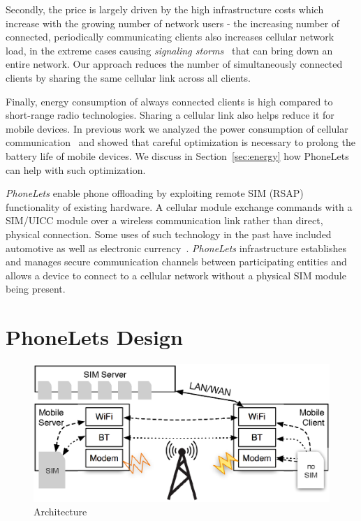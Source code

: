\documentclass{sig-alternate-10pt}
\begin{document}
Secondly, the price is largely driven by the high infrastructure costs which increase with the growing number of network users - the increasing number of connected, periodically communicating clients also increases cellular network load, in the extreme cases causing \emph{signaling storms}~\cite{Yang:wh} that can bring down an entire network. Our approach reduces the number of simultaneously connected clients by sharing the same cellular link across all clients.

Finally, energy consumption of always connected clients is high compared to short-range radio technologies. Sharing a cellular link also helps reduce it for mobile devices. In previous work we analyzed the power consumption of cellular communication~\cite{Aucinas:2013uk} and showed that careful optimization is necessary to prolong the battery life of mobile devices. We discuss in Section~\ref{sec:energy} how PhoneLets can help with such optimization.

\emph{PhoneLets} enable phone offloading by exploiting remote SIM (RSAP) functionality of existing hardware. A cellular module exchange commands with a SIM/UICC module over a wireless communication link rather than direct, physical connection. Some uses of such technology in the past have included automotive as well as electronic currency~\cite{subramanian2003sim}. \emph{PhoneLets} infrastructure establishes and manages secure communication channels between participating entities and allows a device to connect to a cellular network without a physical SIM module being present.


\section{PhoneLets Design}

\begin{figure}
\centering
\includegraphics[width=0.9\columnwidth]{figs/arch}
\vspace{-3mm}
\caption{Architecture}
\label{fig:arch}
\vspace{-2mm}
\end{figure}
\end{document}

